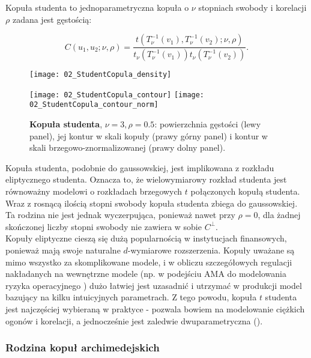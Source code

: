 \begin{df}
	Kopuła studenta to jednoparametryczna kopuła o $\nu$ stopniach swobody i korelacji $\rho$ zadana jest gęstością:
	
	$$ C(u_1, u_2;\nu,\rho) = \frac{t(T_{\nu}^{-1}(v_1), T_{\nu}^{-1}(v_2);\nu,\rho)}{t_{\nu}(T_{\nu}^{-1}(v_1))t_{\nu}(T_{\nu}^{-1}(v_2))}.$$
\end{df}
\begin{figure}[h]
	\centering
	\begin{minipage}{0.5\linewidth}
		\texttt{[image: 02\_StudentCopula\_density]}
	\end{minipage}
	\begin{minipage}{0.45\linewidth}
		\texttt{[image: 02\_StudentCopula\_contour]}
		\texttt{[image: 02\_StudentCopula\_contour\_norm]}
	\end{minipage}
	\caption{\textbf{Kopuła studenta}, $\nu=3, \rho=0.5$: powierzchnia gęstości (lewy panel), jej kontur w skali kopuły (prawy górny panel) i kontur w skali brzegowo-znormalizowanej (prawy dolny panel). \label{fig:student_copula_density}}
\end{figure}
Kopuła studenta, podobnie do gaussowskiej, jest implikowana z rozkładu eliptycznego studenta. Oznacza to, że wielowymiarowy rozkład studenta jest równoważny modelowi o rozkładach brzegowych $t$ połączonych kopułą studenta. Wraz z rosnącą ilością stopni swobody kopuła studenta zbiega do gaussowskiej. Ta rodzina nie jest jednak wyczerpująca, ponieważ nawet przy $\rho=0$, dla żadnej skończonej liczby stopni swobody nie zawiera w sobie $C^{\perp}$.\\

Kopuły eliptyczne cieszą się dużą popularnością w instytucjach finansowych, ponieważ mają swoje naturalne $d$-wymiarowe rozszerzenia. Kopuły uważane są mimo wszystko za skomplikowane modele, i w obliczu szczegółowych regulacji nakładanych na wewnętrzne modele (np. w podejściu AMA do modelowania ryzyka operacyjnego \cite{BaselII}) dużo łatwiej jest uzasadnić i utrzymać w produkcji model bazujący na kilku intuicyjnych parametrach. Z tego powodu, kopuła $t$ studenta jest najczęściej wybieraną w praktyce - pozwala bowiem na modelowanie ciężkich ogonów i korelacji, a jednocześnie jest zaledwie dwuparametryczna (\cite{OpRisk}).\\

\subsubsection{Rodzina kopuł archimedejskich}

